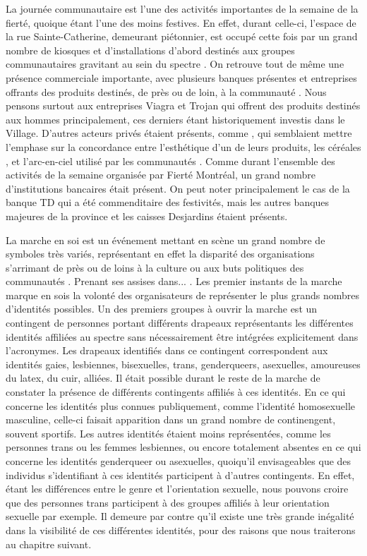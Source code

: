 La journée communautaire est l'une des activités importantes de la semaine de la fierté, quoique étant l'une des moins festives.
En effet, durant celle-ci, l'espace de la rue Sainte-Catherine, demeurant piétonnier, est occupé cette fois par un grand nombre de kiosques et d'installations d'abord destinés aux groupes communautaires gravitant au sein du spectre \lgbt.
On retrouve tout de même une présence commerciale importante, avec plusieurs banques présentes et entreprises offrants des produits destinés, de près ou de loin, à la communauté \lgbt.
Nous pensons surtout aux entreprises Viagra et Trojan qui offrent des produits destinés aux hommes principalement, ces derniers étant historiquement investis dans le Village.
D'autres acteurs privés étaient présents, comme , qui semblaient mettre l'emphase sur la concordance entre l'esthétique d'un de leurs produits, les céréales , et l'arc-en-ciel utilisé par les communautés \lgbt.
Comme durant l'ensemble des activités de la semaine organisée par Fierté Montréal, un grand nombre d'institutions bancaires était présent.
On peut noter principalement le cas de la banque TD qui a été commenditaire des festivités, mais les autres banques majeures de la province et les caisses Desjardins étaient présents.

La marche en soi est un événement mettant en scène un grand nombre de symboles très variés, représentant en effet la disparité des organisations s'arrimant de près ou de loins à la culture ou aux buts politiques des communautés \lgbt.
Prenant ses assises dans... .
Les premier instants de la marche marque en sois la volonté des organisateurs de représenter le plus grands nombres d'identités possibles.
Un des premiers groupes à ouvrir la marche est un contingent de personnes portant différents drapeaux représentants les différentes identités affiliées au spectre \lgbt{} sans nécessairement être intégrées explicitement dans l'acronymes.
Les drapeaux identifiés dans ce contingent correspondent aux identités gaies, lesbiennes, bisexuelles, trans, genderqueers, asexuelles, amoureuses du latex, du cuir, alliées.
Il était possible durant le reste de la marche de constater la présence de différents contingents affiliés à ces identités.
En ce qui concerne les identités plus connues publiquement, comme l'identité homosexuelle masculine, celle-ci faisait apparition dans un grand nombre de continengent, souvent sportifs.
Les autres identités étaient moins représentées, comme les personnes trans ou les femmes lesbiennes, ou encore totalement absentes en ce qui concerne les identités genderqueer ou asexuelles, quoiqu'il envisageables que des individus s'identifiant à ces identités participent à d'autres contingents.
En effet, étant les différences entre le genre et l'orientation sexuelle, nous pouvons croire que des personnes trans participent à des groupes affiliés à leur orientation sexuelle par exemple.
Il demeure par contre qu'il existe une très grande inégalité dans la visibilité de ces différentes identités, pour des raisons que nous traiterons au chapitre suivant.

